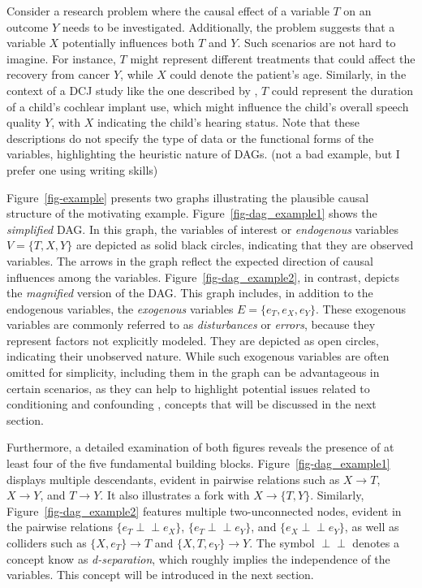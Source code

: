 \documentclass[
  authoryear,
  preprint,
  1p]{elsarticle}
\begin{document}
Consider a research problem where the causal effect of a variable \(T\)
on an outcome \(Y\) needs to be investigated. Additionally, the problem
suggests that a variable \(X\) potentially influences both \(T\) and
\(Y\). Such scenarios are not hard to imagine. For instance, \(T\) might
represent different treatments that could affect the recovery from
cancer \(Y\), while \(X\) could denote the patient's age. Similarly, in
the context of a DCJ study like the one described by
\citet{Boonen_et_al_2020}, \(T\) could represent the duration of a
child's cochlear implant use, which might influence the child's overall
speech quality \(Y\), with \(X\) indicating the child's hearing status.
Note that these descriptions do not specify the type of data or the
functional forms of the variables, highlighting the heuristic nature of
DAGs. {(not a bad example, but I prefer one using writing skills)}

Figure~\ref{fig-example} presents two graphs illustrating the plausible
causal structure of the motivating example.
Figure~\ref{fig-dag_example1} shows the \emph{simplified} DAG. In this
graph, the variables of interest or \emph{endogenous} variables
\(V=\{T,X,Y\}\) are depicted as solid black circles, indicating that
they are observed variables. The arrows in the graph reflect the
expected direction of causal influences among the variables.
Figure~\ref{fig-dag_example2}, in contrast, depicts the \emph{magnified}
version of the DAG. This graph includes, in addition to the endogenous
variables, the \emph{exogenous} variables \(E=\{e_{T},e_{X},e_{Y}\}\).
These exogenous variables are commonly referred to as
\emph{disturbances} or \emph{errors}, because they represent factors not
explicitly modeled. They are depicted as open circles, indicating their
unobserved nature. While such exogenous variables are often omitted for
simplicity, including them in the graph can be advantageous in certain
scenarios, as they can help to highlight potential issues related to
conditioning and confounding \citep{Cinelli_et_al_2020}, concepts that
will be discussed in the next section.

\newcommand{\dsep}{\perp\!\!\!\perp}
\newcommand{\ndsep}{\not\!\perp\!\!\!\perp}

Furthermore, a detailed examination of both figures reveals the presence
of at least four of the five fundamental building blocks.
Figure~\ref{fig-dag_example1} displays multiple descendants, evident in
pairwise relations such as \(X \rightarrow T\), \(X \rightarrow Y\), and
\(T \rightarrow Y\). It also illustrates a fork with
\(X \rightarrow \{T,Y\}\). Similarly, Figure~\ref{fig-dag_example2}
features multiple two-unconnected nodes, evident in the pairwise
relations \(\{e_{T} \perp\!\!\!\perp e_{X}\}\),
\(\{e_{T} \perp\!\!\!\perp e_{Y}\}\), and
\(\{e_{X} \perp\!\!\!\perp e_{Y}\}\), as well as colliders such as
\(\{X,e_{T}\} \rightarrow T\) and \(\{X,T,e_{Y}\} \rightarrow Y\). The
symbol \(\perp\!\!\!\perp\) denotes a concept know as
\emph{d-separation}, which roughly implies the independence of the
variables. This concept will be introduced in the next section.
\end{document}

